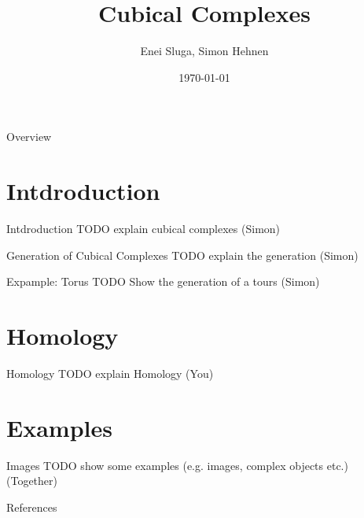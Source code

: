 \documentclass[aspectratio=169,xcolor=dvipsnames]{beamer}
\title{Cubical Complexes}
\subtitle{}
\author{Enei Sluga, Simon Hehnen}
\institute
{
    Faculty of Computer and Information Science \\
    University of Ljubljana %
}
\date{\today} %
\begin{document}
\begin{frame}
    \titlepage
\end{frame}

\begin{frame}{Overview}
    \tableofcontents
\end{frame}

\section{Intdroduction}

\begin{frame}{Intdroduction}
    TODO explain cubical complexes (Simon)
\end{frame}


\begin{frame}{Generation of Cubical Complexes}
    TODO explain the generation (Simon)
\end{frame}


\begin{frame}{Expample: Torus}
    TODO Show the generation of a tours (Simon)
\end{frame}

\section{Homology}

\begin{frame}{Homology}
    TODO explain Homology (You)
\end{frame}

\section{Examples}

\begin{frame}{Images}
    TODO show some examples (e.g. images, complex objects etc.) (Together)
\end{frame}

\begin{frame}{References}
    \footnotesize
    
    
\end{frame}
\end{document}

